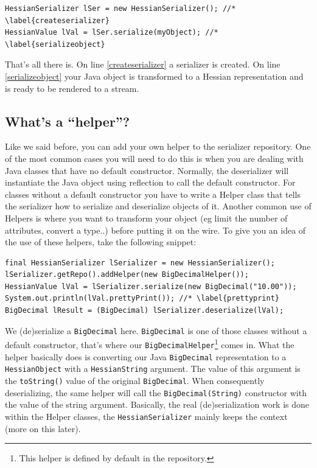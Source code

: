 \documentclass[a4paper]{article}
\begin{document}
\medskip
\begin{lstlisting}
HessianSerializer lSer = new HessianSerializer(); //* \label{createserializer} 
HessianValue lVal = lSer.serialize(myObject); //* \label{serializeobject}
\end{lstlisting}
\medskip

That's all there is. On line \ref{createserializer} a serializer is created. On line \ref{serializeobject} your Java object is transformed to a Hessian representation and is ready to be rendered to a stream.

\subsection{What's a ``helper''?}

Like we said before, you can add your own helper to the serializer repository. 
One of the most common cases you will need to do this is when you are dealing with Java classes that have no default constructor.
Normally, the deserializer will instantiate the Java object using reflection to call the default constructor.
For classes without a default constructor you have to write a Helper class that tells the serializer how to serialize and deserialize objects of it. Another common use of Helpers is where you want to transform your object (eg limit the number of attributes, convert a type..) before putting it on the wire. To give you an idea of the use of these helpers, take the following snippet:

\medskip
\begin{lstlisting}
final HessianSerializer lSerializer = new HessianSerializer();
lSerializer.getRepo().addHelper(new BigDecimalHelper());
HessianValue lVal = lSerializer.serialize(new BigDecimal("10.00"));
System.out.println(lVal.prettyPrint()); //* \label{prettyprint}
BigDecimal lResult = (BigDecimal) lSerializer.deserialize(lVal);
\end{lstlisting}
\medskip

We (de)serialize a \lstinline$BigDecimal$ here. \lstinline$BigDecimal$ is one of those classes without a default constructor, that's where our \lstinline$BigDecimalHelper$\footnote{This helper is defined by default in the repository.} comes in.  What the helper basically does is converting our Java \lstinline$BigDecimal$ representation to a \lstinline$HessianObject$ with a \lstinline$HessianString$ argument. The value of this argument is the \lstinline$toString()$ value of the original \lstinline$BigDecimal$. When consequently deserializing, the same helper will call the \lstinline$BigDecimal(String)$ constructor with the value of the string argument. Basically, the real (de)serialization work is done within the Helper classes, the \lstinline$HessianSerializer$ mainly keeps the context (more on this later).
\end{document}
